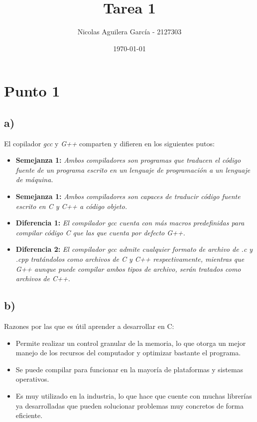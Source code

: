 \documentclass[10pt]{article}
\title{Tarea 1}
\author{Nicolas Aguilera García - 2127303}
\date{\today}
\begin{document}
    \maketitle

    \section*{Punto 1}
    \subsection*{a)}
        El copilador \textit{gcc} y \textit{G++} comparten y difieren en los siguientes putos:
        \begin{itemize}
            \item \textbf{Semejanza 1:} \textit{Ambos compiladores son programas que traducen el código fuente de un programa escrito en un lenguaje de programación a un lenguaje de máquina.}
            
            \item \textbf{Semejanza 1:} \textit{Ambos compiladores son capaces de traducir código fuente escrito en C y C++ a código objeto.}
            
            \item \textbf{Diferencia 1:} \textit{El compilador gcc cuenta con más macros predefinidas para compilar código C que las que cuenta por defecto G++.}
            
            \item \textbf{Diferencia 2:} \textit{El compilador gcc admite cualquier formato de archivo de .c y .cpp tratándolos como archivos de C y C++ respectivamente, mientras que G++ aunque puede compilar ambos tipos de archivo, serán tratados como archivos de C++.}
        \end{itemize}

    \subsection*{b)}
        Razones por las que es útil aprender a desarrollar en C:
        \begin{itemize}
            \item Permite realizar un control granular de la memoria, lo que otorga un mejor manejo de los recursos del computador y optimizar bastante el programa.
            \item Se puede compilar para funcionar en la mayoría de plataformas y sistemas operativos.
            \item Es muy utilizado en la industria, lo que hace que cuente con muchas librerías ya desarrolladas que pueden solucionar problemas muy concretos de forma eficiente.
        \end{itemize}
\end{document}
